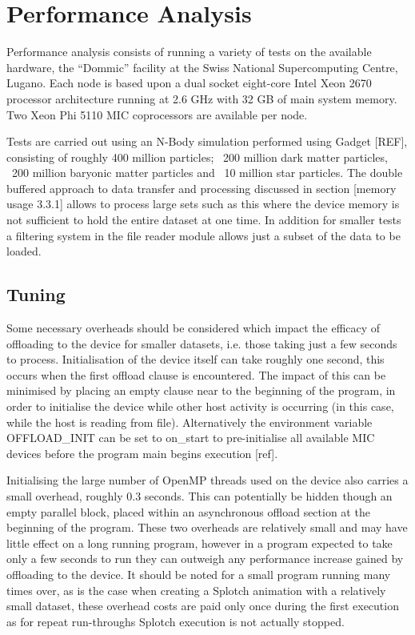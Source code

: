 \documentclass{easychair}
\begin{document}
\section{Performance Analysis}
\label{sect:performance}

Performance analysis consists of running a variety of tests on the available hardware, the “Dommic” facility at the 
Swiss National Supercomputing Centre, Lugano. Each node is based upon  a dual socket eight-core Intel Xeon 2670 
processor architecture running at 2.6 GHz with 32 GB of main system memory. Two Xeon Phi 5110 MIC coprocessors are 
available per node. 

Tests are carried out using an N-Body simulation performed using Gadget [REF], consisting of roughly 400 million 
particles;  ~200 million dark matter particles, ~200 million baryonic matter particles and ~10 million star particles. 
The double buffered approach to data transfer and processing discussed in section [memory usage 3.3.1] allows to 
process large sets such as this where the device memory is not sufficient to hold the entire dataset at one time. In 
addition for smaller tests a filtering system in the file reader module allows just a subset of the data to be loaded.



\subsection{Tuning}
\label{sect:tuning}

Some necessary overheads should be considered which impact the efficacy of offloading to the device for smaller datasets, 
i.e. those taking just a few seconds to process. Initialisation of the device itself can take roughly one second, this 
occurs when the first offload clause is encountered. The impact of this can be minimised by placing an empty clause near 
to the beginning of the program, in order to initialise the device while other host activity is occurring (in this case, 
while the host is reading from file). Alternatively the environment variable OFFLOAD\_INIT can be set to on\_start to 
pre-initialise all available MIC devices before the program main begins execution [ref]. 

Initialising the large number of OpenMP threads used on the device also carries a small overhead, roughly 0.3 seconds. 
This can potentially be hidden though an empty parallel block, placed within an asynchronous offload section at the 
beginning of the program. These two overheads are relatively small and may have little effect on a long running program, 
however in a program expected to take only a few seconds to run they can outweigh any performance increase gained by 
offloading to the device. It should be noted for a small program running many times over, as is the case when creating 
a Splotch animation with a relatively small dataset, these overhead costs are paid only once during the first execution 
as for repeat run-throughs Splotch execution is not actually stopped.
\end{document}
